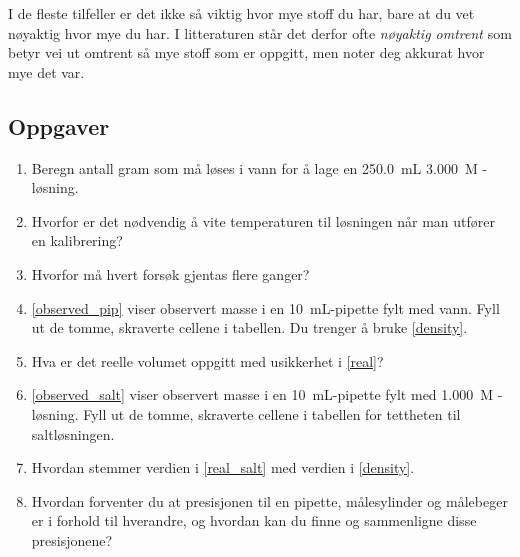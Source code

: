 \documentclass[hidelinks,12pt,norsk,a4paper,fleqn]{scrartcl}
\begin{document}
	I de fleste tilfeller er det ikke så viktig hvor mye stoff du har, bare at du vet nøyaktig hvor mye du har. I litteraturen står det derfor ofte \emph{nøyaktig omtrent} som betyr vei ut omtrent så mye stoff som er oppgitt, men noter deg akkurat hvor mye det var.
	
	\subsection{Oppgaver}
	\begin{enumerate}[label=\alph*)]
		\item Beregn antall gram  som må løses i vann for å lage en \SI{250.0}{mL} \SI{3.000}{M} -løsning.\label{exercise}
		
		\item Hvorfor er det nødvendig å vite temperaturen til løsningen når man utfører en kalibrering?
		
		\item Hvorfor må hvert forsøk gjentas flere ganger?
		
		\item \cref{observed_pip} viser observert masse i en \SI{10}{mL}-pipette fylt med vann. Fyll ut de tomme, skraverte cellene i tabellen. Du trenger å bruke \cref{density}. \label{real} 
		
		\item Hva er det reelle volumet oppgitt med usikkerhet i \ref{real}?
		
		\item \cref{observed_salt} viser observert masse i en \SI{10}{mL}-pipette fylt med \SI{1.000}{M} -løsning. Fyll ut de tomme, skraverte cellene i tabellen for tettheten til saltløsningen. \label{real_salt} 
		
		\item Hvordan stemmer verdien i \ref{real_salt} med verdien i \cref{density}.
		
		\item Hvordan forventer du at presisjonen til en pipette, målesylinder og målebeger er i forhold til hverandre, og hvordan kan du finne og sammenligne disse presisjonene?	
			
	\end{enumerate}
\end{document}
